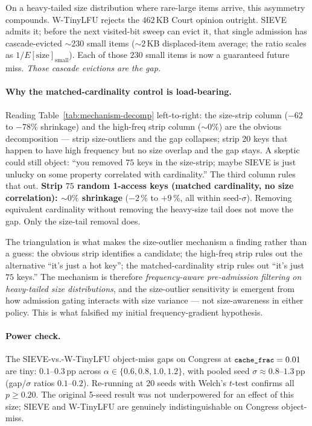 \documentclass[letterpaper,twocolumn,10pt]{article}
\newcommand{\code}[1]{\texttt{\small #1}}
\begin{document}
On a heavy-tailed size distribution where rare-large items arrive,
this asymmetry compounds. W-TinyLFU rejects the $462$\,KB Court
opinion outright. SIEVE admits it; before the next visited-bit
sweep can evict it, that single admission has cascade-evicted
$\sim 230$ small items ($\sim 2$\,KB displaced-item average; the
ratio scales as $1/E[\text{size}]_{\text{small}}$). Each of those
$230$ small items is now a guaranteed future miss. \emph{Those
cascade evictions are the gap.}

\paragraph{Why the matched-cardinality control is load-bearing.}
Reading Table~\ref{tab:mechanism-decomp} left-to-right: the
size-strip column ($-62$ to $-78\%$ shrinkage) and the high-freq
strip column ($\sim 0\%$) are the obvious decomposition — strip
size-outliers and the gap collapses; strip 20 keys that happen to
have high frequency but no size overlap and the gap stays. A skeptic
could still object: ``you removed $75$ keys in the size-strip; maybe
SIEVE is just unlucky on some property correlated with cardinality.''
The third column rules that out. \textbf{Strip $75$ random 1-access
keys (matched cardinality, no size correlation): $\sim 0\%$
shrinkage} ($-2$\,\% to $+9$\,\%, all within seed-$\sigma$).
Removing equivalent cardinality without removing the heavy-size tail
does not move the gap. Only the size-tail removal does.

The triangulation is what makes the size-outlier mechanism a finding
rather than a guess: the obvious strip identifies a candidate; the
high-freq strip rules out the alternative ``it's just a hot key'';
the matched-cardinality strip rules out ``it's just $75$ keys.'' The
mechanism is therefore \emph{frequency-aware pre-admission filtering
on heavy-tailed size distributions}, and the size-outlier sensitivity
is emergent from how admission gating interacts with size variance —
not size-awareness in either policy. This is what falsified my
initial frequency-gradient hypothesis.

\paragraph{Power check.} The SIEVE-vs.-W-TinyLFU object-miss gaps
on Congress at $\code{cache\_frac}=0.01$ are tiny: $0.1$--$0.3$\,pp
across $\alpha \in \{0.6, 0.8, 1.0, 1.2\}$, with pooled seed
$\sigma \approx 0.8$--$1.3$\,pp (gap/$\sigma$ ratios $0.1$--$0.2$).
Re-running at $20$ seeds with Welch's $t$-test confirms all $p \geq
0.20$. The original 5-seed result was not underpowered for an effect
of this size; SIEVE and W-TinyLFU are genuinely indistinguishable on
Congress object-miss.
\end{document}
